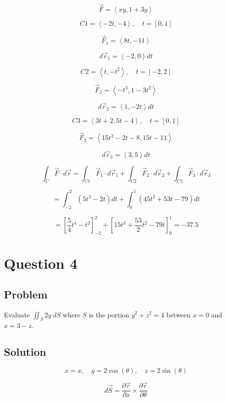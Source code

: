 \documentclass[12pt]{article}
\begin{document}
\[
    \vec{F} = \left\langle xy, 1 + 3y\right\rangle
\]

\[
    C1 = \left\langle -2t, -4\right\rangle, \quad t = [0, 1]
\]

\[
    \vec{F}_1 = \left\langle 8t, -11 \right\rangle
\]

\[
    d \vec{r}_1 = \left\langle -2, 0\right\rangle d t
\]

\[
    C2 = \left\langle t, -t^2\right\rangle, \quad t = [-2, 2]
\]

\[
    \vec{F}_2 = \left\langle -t^3, 1 - 3t^2\right\rangle
\]

\[
    d \vec{r}_2 = \left\langle 1, -2t\right\rangle d t
\]

\[
    C3 = \left\langle 3t + 2, 5t -4\right\rangle, \quad t = [0, 1]
\]

\[
    \vec{F}_3 = \left\langle 15t^2 - 2t - 8, 15t - 11\right\rangle
\]

\[
    d \vec{r}_3 = \left\langle 3, 5\right\rangle d t
\]

\[
    \int_C \vec{F} \cdot d \vec{r}
    = \int_{C1} \vec{F}_1 \cdot d \vec{r}_1
    + \int_{C2} \vec{F}_2 \cdot d \vec{r}_2
    + \int_{C3} \vec{F}_3 \cdot d \vec{r}_3
\]

\[
    = \int_{-2}^{2} \left(5t^3 - 2t\right) d t
    + \int_{0}^{1} \left(45t^2 + 53t - 79\right) d t
\]

\[
    = \left[\frac{5}{4} t^4 - t^2\right]_{-2}^{2}
    + {\left[15t^3 + \frac{53}{2} t^2 - 79t\right]}_{0}^{1}
    = -37.5
\]

\newpage
\section{Question 4}

\subsection{Problem}

Evaluate \(\iint_S 2y\ dS\) where \(S\) is the portion \(y^2 + z^2 = 4\) between \(x = 0\)
and \(x = 3 - z\).

\subsection{Solution}

\[
    x = x, \quad y = 2\cos(\theta), \quad z = 2\sin(\theta)
\]

\[
    d\vec{S} = \frac{\partial \vec{r}}{\partial x} \times \frac{\partial \vec{r}}{\partial \theta}
\]
\end{document}
